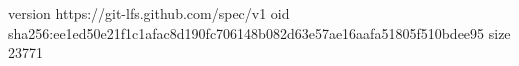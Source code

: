 version https://git-lfs.github.com/spec/v1
oid sha256:ee1ed50e21f1c1afac8d190fc706148b082d63e57ae16aafa51805f510bdee95
size 23771
